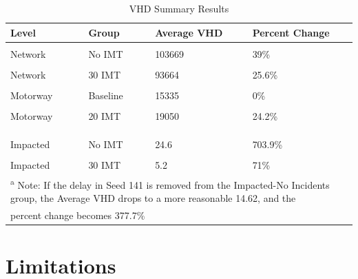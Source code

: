 \documentclass[fancy, oneside, mastersfancy, ms]{byuthesis}
\begin{document}
\hypertarget{tbl-VHD_summary_table}{}
\begin{table}
\caption{\label{tbl-VHD_summary_table}VHD Summary Results }\tabularnewline

\centering
\begin{tabular}[t]{llll}
\toprule
\textbf{Level} & \textbf{Group} & \textbf{Average VHD} & \textbf{Percent Change}\\
\midrule
\cellcolor{gray!6}{Network} & \cellcolor{gray!6}{Baseline} & \cellcolor{gray!6}{74568} & \cellcolor{gray!6}{0\%}\\
Network & No IMT & 103669 & 39\%\\
\cellcolor{gray!6}{Network} & \cellcolor{gray!6}{20 IMT} & \cellcolor{gray!6}{96187} & \cellcolor{gray!6}{29\%}\\
Network & 30 IMT & 93664 & 25.6\%\\
\cellcolor{gray!6}{} & \cellcolor{gray!6}{} & \cellcolor{gray!6}{ \vphantom{1}} & \cellcolor{gray!6}{}\\
\addlinespace
Motorway & Baseline & 15335 & 0\%\\
\cellcolor{gray!6}{Motorway} & \cellcolor{gray!6}{No IMT} & \cellcolor{gray!6}{23282} & \cellcolor{gray!6}{51.8\%}\\
Motorway & 20 IMT & 19050 & 24.2\%\\
\cellcolor{gray!6}{Motorway} & \cellcolor{gray!6}{30 IMT} & \cellcolor{gray!6}{17948} & \cellcolor{gray!6}{17\%}\\
 &  &  & \\
\addlinespace
\cellcolor{gray!6}{Impacted} & \cellcolor{gray!6}{Baseline} & \cellcolor{gray!6}{3.1} & \cellcolor{gray!6}{0\%}\\
Impacted & No IMT & 24.6 & 703.9\%\\
\cellcolor{gray!6}{Impacted} & \cellcolor{gray!6}{20 IMT} & \cellcolor{gray!6}{8.4} & \cellcolor{gray!6}{173.4\%}\\
Impacted & 30 IMT & 5.2 & 71\%\\
\bottomrule
\multicolumn{4}{l}{\textsuperscript{a} Note: If the delay in Seed 141 is removed from the Impacted-No Incidents group, the Average VHD drops to a more reasonable 14.62, and the}\\
\multicolumn{4}{l}{percent change becomes 377.7\%}\\
\end{tabular}
\end{table}

\hypertarget{sec-limitations}{%
\section{Limitations}\label{sec-limitations}}
\end{document}
